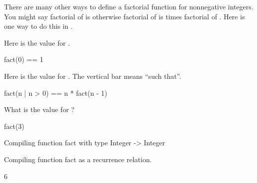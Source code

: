 There are many other ways to define a factorial function for nonnegative
integers.
You might
say
factorial of  is  otherwise factorial of  is
 times factorial of .
Here is one way to do this in \Language{}.
%
\begin{xtc}
\begin{xtccomment}
Here is the value for .
\end{xtccomment}
\begin{spadsrc}
fact(0) == 1 
\end{spadsrc}
\end{xtc}
\begin{xtc}
\begin{xtccomment}
Here is the value for .
The vertical bar \spadSyntax{|} means
``such that''.
\end{xtccomment}
\begin{spadsrc}
fact(n | n > 0) == n * fact(n - 1) 
\end{spadsrc}
\end{xtc}
\begin{xtc}
\begin{xtccomment}
What is the value for ?
\end{xtccomment}
\begin{spadsrc}
fact(3) 
\end{spadsrc}
\begin{MessageOutput}
   Compiling function fact with type Integer -> Integer 
\end{MessageOutput}
\begin{MessageOutput}
   Compiling function fact as a recurrence relation.
\end{MessageOutput}
\begin{TeXOutput}
\begin{fricasmath}{3}
6%
\end{fricasmath}
\end{TeXOutput}
\end{xtc}
